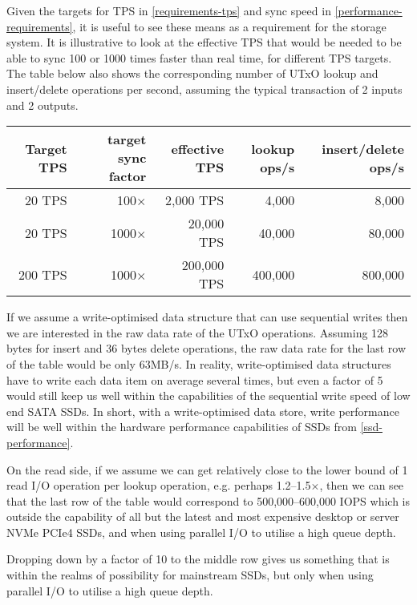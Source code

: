 \documentclass[11pt,a4paper]{article}
\begin{document}
Given the targets for TPS in \cref{requirements-tps} and sync speed in
\cref{performance-requirements}, it is useful to see these means as a
requirement for the storage system. It is illustrative to look at the effective
TPS that would be needed to be able to sync 100 or 1000 times faster than real
time, for different TPS targets. The table below also shows the corresponding
number of UTxO {\sc lookup} and {\sc insert}/{\sc delete} operations per second,
assuming the typical transaction of 2 inputs and 2 outputs.
\begin{center}
\begin{tabular}[]{rrrrr}
  Target TPS & target sync factor
             & effective TPS
             & {\sc lookup} ops/s
             & {\sc insert}/{\sc delete} ops/s \\
  \toprule
   20 TPS &   100$\times$ &   2,000 TPS &   4,000 &   8,000 \\
   20 TPS &  1000$\times$ &  20,000 TPS &  40,000 &  80,000 \\
  200 TPS &  1000$\times$ & 200,000 TPS & 400,000 & 800,000
\end{tabular}
\end{center}

If we assume a write-optimised data structure that can use sequential writes
then we are interested in the raw data rate of the UTxO operations. Assuming
128 bytes for {\sc insert} and 36 bytes {\sc delete} operations, the raw data
rate for the last row of the table would be only 63MB/s. In reality,
write-optimised data structures have to write each data item on average several
times, but even a factor of 5 would still keep us well within the capabilities
of the sequential write speed of low end SATA SSDs. In short, with a
write-optimised data store, write performance will be well within the hardware
performance capabilities of SSDs from \cref{ssd-performance}.

On the read side, if we assume we can get relatively close to the lower bound
of 1 read I/O operation per {\sc lookup} operation, e.g. perhaps
1.2--1.5$\times$, then we can see that the last row of the table would
correspond to 500,000--600,000 IOPS which is outside the capability of all but
the latest and most expensive desktop or server NVMe PCIe4 SSDs, and when using
parallel I/O to utilise a high queue depth.

Dropping down by a factor of 10 to the middle row gives us something that is
within the realms of possibility for mainstream SSDs, but only when using
parallel I/O to utilise a high queue depth.
\end{document}
